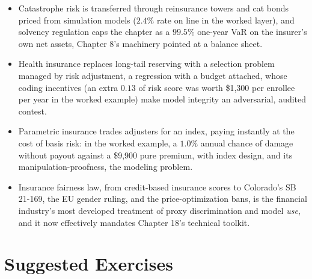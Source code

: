 \documentclass[../ai_in_finance]{subfiles}
\begin{document}
\begin{itemize}
\item Catastrophe risk is transferred through reinsurance towers and cat bonds priced from simulation models ($2.4\%$ rate on line in the worked layer), and solvency regulation caps the chapter as a $99.5\%$ one-year VaR on the insurer's own net assets, Chapter 8's machinery pointed at a balance sheet.
\item Health insurance replaces long-tail reserving with a selection problem managed by risk adjustment, a regression with a budget attached, whose coding incentives (an extra $0.13$ of risk score was worth \$1{,}300 per enrollee per year in the worked example) make model integrity an adversarial, audited contest.
\item Parametric insurance trades adjusters for an index, paying instantly at the cost of basis risk: in the worked example, a $1.0\%$ annual chance of damage without payout against a \$9{,}900 pure premium, with index design, and its manipulation-proofness, the modeling problem.
\item Insurance fairness law, from credit-based insurance scores to Colorado's SB 21-169, the EU gender ruling, and the price-optimization bans, is the financial industry's most developed treatment of proxy discrimination and model \emph{use}, and it now effectively mandates Chapter 18's technical toolkit.
\end{itemize}

\section{Suggested Exercises}
\end{document}
